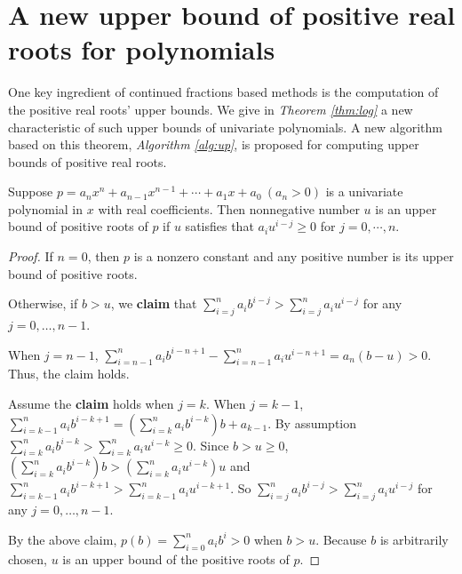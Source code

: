 
\section{A new upper bound of positive real roots for polynomials}
\label{sec:thm}

One key ingredient of continued fractions based methods is the computation of  the positive real roots' upper bounds. We give in {\em Theorem \ref{thm:log}} a new characteristic of such upper bounds of univariate polynomials. A new algorithm based on this theorem, {\em Algorithm \ref{alg:up}}, is proposed for computing upper bounds of positive real roots.


\begin{theorem}
	\label{thm:log}
  Suppose   $p=a_nx^n+a_{n-1}x^{n-1}+\cdots+a_1x+a_0\ (a_n>0)$  is a univariate polynomial in $x$ with real coefficients.  Then  nonnegative number $u$ is an upper bound of positive roots of $p$ if $u$   satisfies that  $a_i u^{i-j}\ge 0$ for $j=0,\cdots, n $.
\end{theorem}
\begin{proof}
  If $n=0$, then $p$ is a nonzero constant and any positive number is its upper bound of positive roots.

  Otherwise, if $b>u$,  we {\bf claim} that $\sum_{i=j}^na_ib^{i-j}> \sum_{i=j}^na_iu^{i-j}$ for any $j= 0,\ldots,n-1$.

  When $j=n-1$, $\sum_{i=n-1}^na_ib^{i-n+1}-\sum_{i=n-1}^na_iu^{i-n+1}=a_n(b-u)>0.$ Thus, the claim holds.

  Assume the {\bf claim} holds  when $j=k$. When $j=k-1$,  $\sum_{i=k-1}^na_ib^{i-k+1}=\left(\sum_{i=k}^na_ib^{i-k}\right)b+a_{k-1} $. By assumption
  $\sum_{i=k}^na_ib^{i-k}>\sum_{i=k}^na_iu^{i-k}\ge0$. Since $b>u\ge0$, $\left(\sum_{i=k}^na_ib^{i-k}\right)b>\left (\sum_{i=k}^na_iu^{i-k} \right)u  $
  and $\sum_{i=k-1}^na_ib^{i-k+1}> \sum_{i=k-1}^na_iu^{i-k+1}$. So  $\sum_{i=j}^na_ib^{i-j}> \sum_{i=j}^na_iu^{i-j}$ for any $j= 0,\ldots,n-1$.


  By the above claim,   $p(b)=\sum_{i=0}^na_ib^i>0$ when  $b>u$. Because $b$ is arbitrarily chosen, $u$ is an upper bound of the positive roots of $p$.

\end{proof}

